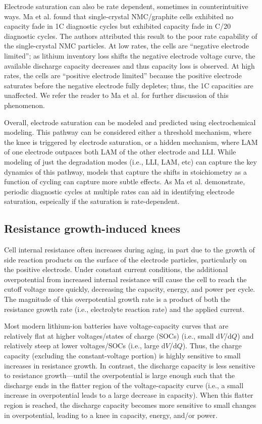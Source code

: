 \documentclass[journal=jpclcd,manuscript=article]{achemso}
\begin{document}
Electrode saturation can also be rate dependent, sometimes in counterintuitive ways. Ma et al.\cite{ma_editors_2019} found that single-crystal NMC/graphite cells exhibited no capacity fade in 1C diagnostic cycles but exhibited capacity fade in C/20 diagnostic cycles. The authors attributed this result to the poor rate capability of the single-crystal NMC particles. At low rates, the cells are ``negative electrode limited''; as lithium inventory loss shifts the negative electrode voltage curve, the available discharge capacity decreases and thus capacity loss is observed. At high rates, the cells are ``positive electrode limited'' because the positive electrode saturates before the negative electrode fully depletes; thus, the 1C capacities are unaffected. We refer the reader to Ma et al.\cite{ma_editors_2019} for further discussion of this phenomenon.

Overall, electrode saturation can be modeled and predicted using electrochemical modeling. This pathway can be considered either a threshold mechanism, where the knee is triggered by electrode saturation, or a hidden mechanism, where LAM of one electrode outpaces both LAM of the other electrode and LLI. While modeling of just the degradation modes (i.e., LLI, LAM, etc) can capture the key dynamics of this pathway, models that capture the shifts in stoichiometry as a function of cycling can capture more subtle effects. As Ma et al.\cite{ma_editors_2019} demonstrate, periodic diagnostic cycles at multiple rates can aid in identifying electrode saturation, espeically if the saturation is rate-dependent.

\subsection{Resistance growth-induced knees}

Cell internal resistance often increases during aging, in part due to the growth of side reaction products on the surface of the electrode particles, particularly on the positive electrode\cite{ma_editors_2019}. Under constant current conditions, the additional overpotential from increased internal resistance will cause the cell to reach the cutoff voltage more quickly, decreasing the capacity, energy, and power per cycle. The magnitude of this overpotential growth rate is a product of both the resistance growth rate (i.e., electrolyte reaction rate) and the applied current.

Most modern lithium-ion batteries have voltage-capacity curves that are relatively flat at higher voltages/states of charge (SOCs) (i.e., small d$V$/d$Q$) and relatively steep at lower voltages/SOCs (i.e., large d$V$/d$Q$). Thus, the charge capacity (excluding the constant-voltage portion) is highly sensitive to small increases in resistance growth. In contrast, the discharge capacity is less sensitive to resistance growth---until the overpotential is large enough such that the discharge ends in the flatter region of the voltage-capacity curve (i.e., a small increase in overpotential leads to a large decrease in capacity). When this flatter region is reached, the discharge capacity becomes more sensitive to small changes in overpotential, leading to a knee in capacity, energy, and/or power.
\end{document}
